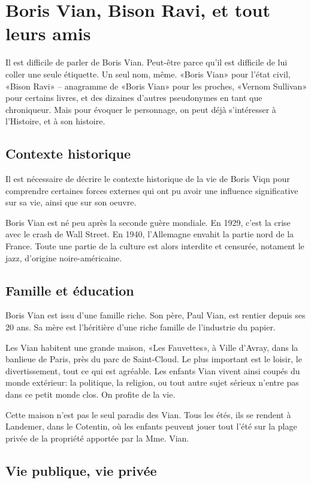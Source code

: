 
\section{Boris Vian, Bison Ravi, et tout leurs amis}


Il est difficile de parler de Boris Vian. Peut-être parce qu'il
est difficile de lui coller une seule étiquette. Un seul nom,
même. «Boris Vian» pour l'état civil, «Bison Ravi» -- anagramme
de «Boris Vian» pour les proches, «Vernom Sullivan» pour certains
livres, et des dizaines d'autres pseudonymes en tant que chroniqueur.
Mais pour évoquer le personnage, on peut déjà s'intéresser à l'Histoire,
et à son histoire.

\subsection{Contexte historique}
Il est nécessaire de décrire le contexte historique de la vie
de Boris Viqn pour comprendre certaines forces externes qui
ont pu avoir une influence significative sur sa vie, ainsi que
sur son oeuvre.

Boris Vian est né peu après la seconde guère mondiale. En 1929, c'est
la crise avec le crash de Wall Street. En 1940, l'Allemagne envahit la
partie nord de la France. Toute une partie de la culture est alors
interdite et censurée, notament le jazz, d'origine noire-américaine.

\subsection{Famille et éducation}

Boris Vian est issu d'une famille riche. Son père, Paul Vian, est rentier
depuis ses 20 ans. Sa mère est l'héritière d'une riche famille de l'industrie
du papier.

Les Vian habitent une grande maison, «Les Fauvettes», à Ville d'Avray, dans la
banlieue de Paris, près du parc de Saint-Cloud. Le plus important est le loisir,
le divertissement, tout ce qui est agréable. Les enfants Vian vivent ainsi coupés
du monde extérieur: la politique, la religion, ou tout autre sujet sérieux n'entre
pas dans ce petit monde clos. On profite de la vie.

Cette maison n'est pas le seul paradis des Vian. Tous les étés, ils se rendent
à Landemer, dans le Cotentin, où les enfants peuvent jouer tout l'été sur la
plage privée de la propriété apportée par la Mme. Vian. 

\subsection{Vie publique, vie privée}

